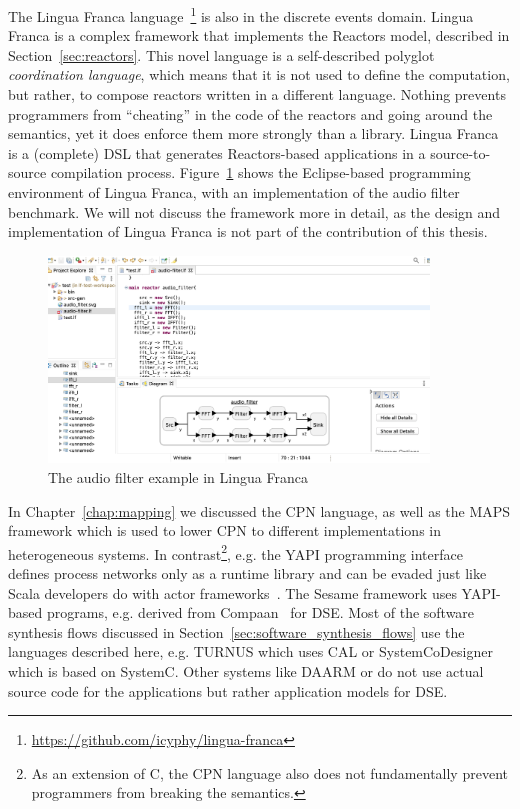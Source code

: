 The Lingua Franca language~\cite{lohstroh2020language}\footnote{\url{https://github.com/icyphy/lingua-franca}} is  also in the discrete events domain.
Lingua Franca is a complex framework that implements the Reactors model, described in Section~\ref{sec:reactors}.
This novel language is a self-described polyglot \emph{coordination language}, which means that it is not used to define the computation, but rather, to compose reactors written in a different language.
Nothing prevents programmers from ``cheating'' in the code of the reactors and going around the semantics, yet it does enforce them more strongly than a library.
Lingua Franca is a (complete) \ac{DSL} that generates Reactors-based applications in a source-to-source compilation process.
Figure~\ref{fig:audio_filter_lf} shows the Eclipse-based programming environment of Lingua Franca, with an implementation of the audio filter benchmark.
We will not discuss the framework more in detail, as the design and implementation of Lingua Franca is not part of the contribution of this thesis.

\begin{figure}[t]
	\centering
	\includegraphics[width=0.9\textwidth]{figures/audio_filter_lf_screenshot.png}
	\caption{The audio filter example in Lingua Franca}
	\label{fig:audio_filter_lf}
\end{figure}

In Chapter~\ref{chap:mapping} we discussed the \ac{CPN} language, as well as the \ac{MAPS} framework which is used to lower \ac{CPN} to different implementations in heterogeneous systems.
In contrast\footnote{As an extension of C, the \ac{CPN} language also does not fundamentally prevent programmers from breaking the semantics.}, e.g. the YAPI programming interface~\cite{yapi} defines process networks only as a runtime library and can be evaded just like Scala developers do with actor frameworks~\cite{tasharofi2013scala}.
The Sesame framework uses YAPI-based programs, e.g. derived from Compaan~\cite{stefanov2003deriving} for \ac{DSE}\cite{pimentel2006systematic}.
Most of the software synthesis flows discussed in Section~\ref{sec:software_synthesis_flows} use the languages described here, e.g. TURNUS which uses CAL or SystemCoDesigner which is based on SystemC.
Other systems like DAARM or \mocasin do not use actual source code for the applications but rather application models for \ac{DSE}.


